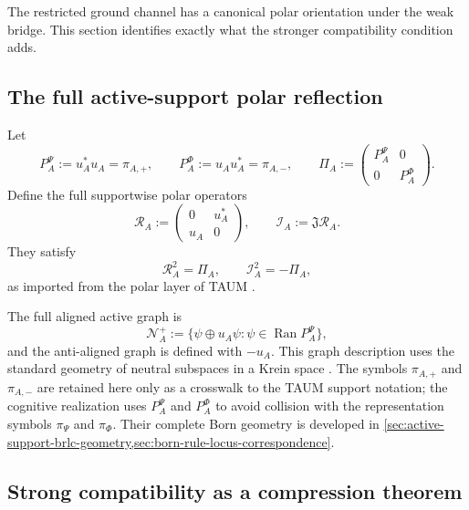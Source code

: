 \documentclass[11pt,reqno]{scrartcl}
\newcommand{\piP}{\pi_{\Psi}}
\newcommand{\piF}{\pi_{\Phi}}
\newcommand{\fundJ}{\mathfrak J}
\newcommand{\polA}{u_A}
\newcommand{\RA}{\mathcal R_{A}}
\newcommand{\IA}{\mathcal I_{A}}
\newcommand{\PiA}{\Pi_{A}}
\DeclareMathOperator{\Ran}{Ran}
\newcommand{\suppProjP}{P_{A}^{\Psi}}
\newcommand{\suppProjF}{P_{A}^{\Phi}}
\theoremstyle{plain}
\theoremstyle{definition}
\theoremstyle{remark}
\begin{document}
The restricted ground channel has a canonical polar orientation under the
weak bridge.  This section identifies exactly what the stronger compatibility
condition adds.

\subsection{The full active-support polar reflection}

Let
\begin{equation}
  \suppProjP:=\polA^*\polA=\pi_{A,+},
  \qquad
  \suppProjF:=\polA\polA^*=\pi_{A,-},
  \qquad
  \PiA:=\begin{pmatrix}\suppProjP&0\\0&\suppProjF\end{pmatrix}.
  \label{eq:full-polar-supports}
\end{equation}
Define the full supportwise polar operators
\begin{equation}
  \RA:=\begin{pmatrix}0&\polA^*\\\polA&0\end{pmatrix},
  \qquad
  \IA:=\fundJ\RA.
  \label{eq:full-polar-RI}
\end{equation}
They satisfy
\begin{equation}
  \RA^2=\PiA,
  \qquad
  \IA^2=-\PiA,
  \label{eq:full-polar-squares}
\end{equation}
as imported from the polar layer of TAUM \cite{TAUM2026}.

The full aligned active graph is
\begin{equation}
  \mathscr N_A^+
  :=\{\psi\oplus\polA\psi:
       \psi\in\Ran\suppProjP\},
  \label{eq:full-active-aligned-graph-preview}
\end{equation}
and the anti-aligned graph is defined with \(-\polA\).  This graph description
uses the standard geometry of neutral subspaces in a Krein space
\cite{Bognar}.  The symbols $\pi_{A,+}$ and $\pi_{A,-}$ are retained here only as a
crosswalk to the TAUM support notation; the cognitive realization uses
$\suppProjP$ and $\suppProjF$ to avoid collision with the representation
symbols $\piP$ and $\piF$.  Their complete Born geometry is developed in
\cref{sec:active-support-brlc-geometry,sec:born-rule-locus-correspondence}.

\subsection{Strong compatibility as a compression theorem}
\end{document}
